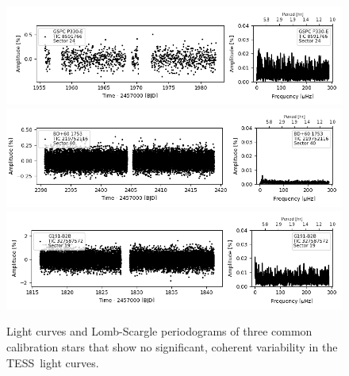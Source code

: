 \documentclass[twocolumn, linenumbers]{aastex631}
\newcommand{\tess}{TESS}
\begin{document}
\begin{figure}
    \centering
    \includegraphics[width=0.8\linewidth]{figures/tic00000008591766_s024_flat2.fits.png}
    \includegraphics[width=0.8\linewidth]{tic00000219752116_s040_flat1.fits.png}
    \includegraphics[width=0.8\linewidth]{figures/tic00000327587572_s019_norm1.fits.png}
    \caption{Light curves and Lomb-Scargle periodograms of three common calibration stars that show no significant, coherent variability in the \tess\ light curves.}
    \label{fig:novar}
\end{figure}
\end{document}
